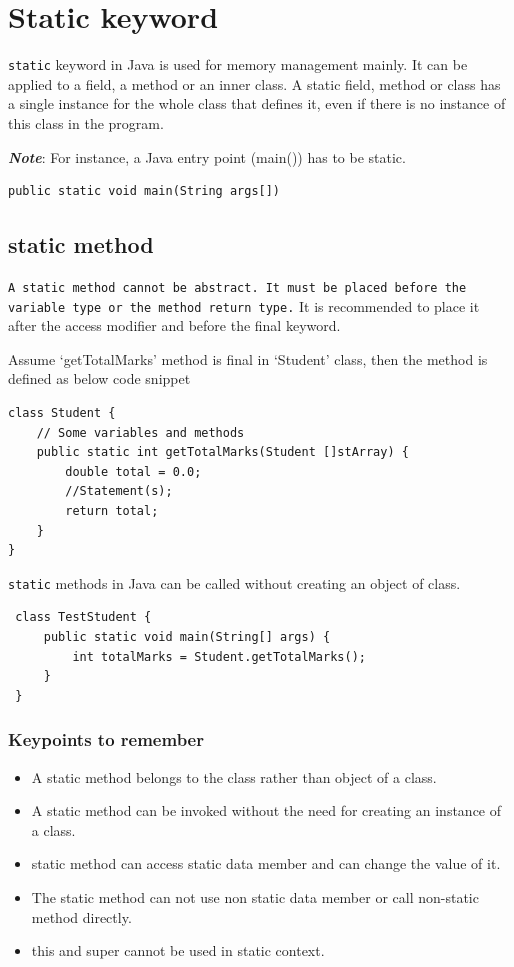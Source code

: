 \documentclass[11pt,a4paper]{article}
\begin{document}
\section*{Static keyword}

  \lstinline!static! keyword in Java is used for memory management mainly. It can be applied to a field, a method or an inner class. A static field, method or class has a single instance for the whole class that defines it, even if there is no instance of this class in the program.

  \emph{\textbf{Note}}: For instance, a Java entry point (main()) has to be static.
   \begin{lstlisting}[numbers=none]
    public static void main(String args[])
 \end{lstlisting}

 \subsection*{static method}
 \lstinline!A static method cannot be abstract. It must be placed before the variable type or the method return type.!
 It is recommended to place it after the access modifier and before the final keyword. 
 
 Assume `getTotalMarks' method is final in `Student' class, then the method is defined as below code snippet
 
 \begin{lstlisting}
class Student {
    // Some variables and methods
    public static int getTotalMarks(Student []stArray) {
        double total = 0.0;
        //Statement(s);
        return total;
    }
}
 \end{lstlisting}
 
\lstinline!static! methods in Java can be called without creating an object of class.
 
\begin{lstlisting}
 class TestStudent {
     public static void main(String[] args) {
         int totalMarks = Student.getTotalMarks();
     }
 }
\end{lstlisting}

\subsubsection*{Keypoints to remember} 
 \begin{itemize}
  \item A static method belongs to the class rather than object of a class.
  \item A static method can be invoked without the need for creating an instance of a class.
  \item static method can access static data member and can change the value of it.
  \item The static method can not use non static data member or call non-static method directly.
  \item this and super cannot be used in static context.
  \end{itemize}
    
\end{document}
